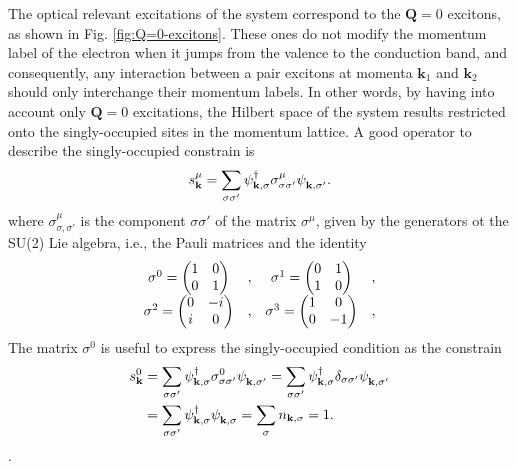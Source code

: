 \documentclass[english,aps,prd,nofootinbib,twocolumn]{revtex4-1}
\begin{document}
The optical relevant excitations of the system correspond to the $\mathbf{Q}=0$ excitons, as shown in Fig. \ref{fig:Q=0-excitons}. These ones do not modify the momentum label of the electron when it jumps from the valence to the conduction band, and consequently, any interaction between a pair excitons at momenta $\mathbf{k}_{1}$ and $\mathbf{k}_{2}$ should only interchange their momentum labels. In other words, by having into account only $\mathbf{Q}=0$ excitations, the Hilbert space of the system results restricted onto the singly-occupied sites in the momentum lattice. A good operator to describe the singly-occupied constrain is
\begin{equation}
\label{eq:SU(2)-spin-operator}
s^{\mu}_{\mathbf{k }} = \sum_{\sigma \sigma'} 
\psi_{\mathbf{k ,\sigma }}^{\textcolor{black}{\dagger}}
\sigma^{\mu }_{\sigma \sigma'}
\psi_{\mathbf{k ,\sigma'}}^{\textcolor{white}{\dagger}}.
\end{equation}
where $\sigma^{\mu }_{\sigma  ,\sigma '}$ is the component $\sigma \sigma '$ of the matrix $\sigma^{\mu }$, given by the generators ot the SU(2) Lie algebra, i.e., the Pauli matrices and the identity
\begin{equation}
\begin{matrix}
\sigma^{0}_{\textcolor{white}{,}} = 
\begin{pmatrix}
1	&	0	\\	0	&	1
\end{pmatrix}	&	,	&	
\sigma^{1}_{\textcolor{white}{,}} = 
\begin{pmatrix}
0	&	1	\\	1	&	0
\end{pmatrix}	&	, \\
\sigma^{2}_{\textcolor{white}{,}} = 
\begin{pmatrix}
0	&	-i	\\	i	&	0
\end{pmatrix}	&	,	&	
\sigma^{3}_{\textcolor{white}{,}} = 
\begin{pmatrix}
1	&	0	\\	0	&	-1
\end{pmatrix}	&	,
\end{matrix}
\end{equation}
The matrix $\sigma^{0}$ is useful to express the singly-occupied condition as the constrain
\begin{equation}
\begin{split}
s^{0}_{\mathbf{k }} &= \sum_{\sigma \sigma'} 
\psi_{\mathbf{k ,\sigma }}^{\textcolor{black}{\dagger}}
\sigma^{0}_{\sigma \sigma'}
\psi_{\mathbf{k ,\sigma'}}^{\textcolor{white}{\dagger}} =
\sum_{\sigma \sigma'} 
\psi_{\mathbf{k ,\sigma }}^{\textcolor{black}{\dagger}}
\delta_{\sigma \sigma'}
\psi_{\mathbf{k ,\sigma'}}^{\textcolor{white}{\dagger}} \\ &=
\sum_{\sigma \sigma'} 
\psi_{\mathbf{k ,\sigma }}^{\textcolor{black}{\dagger}}
\psi_{\mathbf{k ,\sigma }}^{\textcolor{white}{\dagger}} =
\sum_{\sigma } 
n_{\mathbf{k ,\sigma }} = 
1.
\end{split}
\end{equation}.
\end{document}
